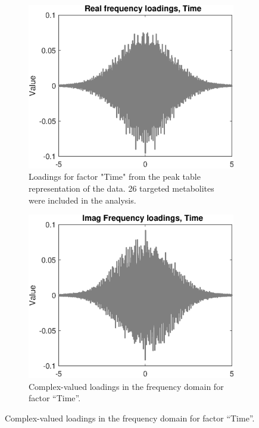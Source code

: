 \documentclass[preprint,12pt]{elsarticle}
\begin{document}
\begin{figure}[hbtp!]
    \vfill
    
    \begin{subfigure}[b]{0.45\textwidth}
        \centering
        \includegraphics[width=\textwidth]{figures/freq_loads_time_real.eps}
        \caption{Loadings for factor "Time" from the peak table representation of the data. 26 targeted metabolites were included in the analysis.}
        \label{fig:figure3}
    \end{subfigure}
    \hfill
    \begin{subfigure}[b]{0.45\textwidth}
        \centering
        \includegraphics[width=\textwidth]{figures/freq_loads_time_imag.eps}
        \caption{Complex-valued loadings in the frequency domain for factor ``Time''.}
        \label{fig:figure4}
    \end{subfigure}
    \vfill


\end{figure}
\end{document}
